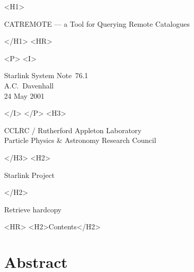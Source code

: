 \documentclass[twoside,11pt]{article}
\newcommand{\stardoccategory}  {Starlink System Note}
\newcommand{\stardocsource}    {ssn\stardocnumber}
\newcommand{\stardocnumber}    {76.1}
\newcommand{\stardocauthors}   {A.C.~Davenhall}
\newcommand{\stardocdate}      {24 May 2001}
\newcommand{\stardoctitle}     {CATREMOTE --- a Tool for Querying Remote
Catalogues}
\newcommand{\htmladdnormallink}[2]{#1}
\newcommand{\htmladdimg}[1]{}
\newcommand{\htmlref}[2]{#1}
\newcommand{\htmladdtonavigation}[1]{}
\newcommand{\xlabel}[1]{}
\renewcommand{\_}{\texttt{\symbol{95}}}
\begin{document}
\begin{htmlonly}
   \xlabel{}
   \begin{rawhtml} <H1> \end{rawhtml}
      \stardoctitle
   \begin{rawhtml} </H1> <HR> \end{rawhtml}

   \begin{rawhtml} <P> <I> \end{rawhtml}
   \stardoccategory\ \stardocnumber \\
   \stardocauthors \\
   \stardocdate
   \begin{rawhtml} </I> </P> <H3> \end{rawhtml}
      \htmladdnormallink{CCLRC / Rutherford Appleton Laboratory}
                        {http://www.cclrc.ac.uk} \\
      \htmladdnormallink{Particle Physics \& Astronomy Research Council}
                        {http://www.pparc.ac.uk} \\
   \begin{rawhtml} </H3> <H2> \end{rawhtml}
      \htmladdnormallink{Starlink Project}{http://www.starlink.rl.ac.uk/}
   \begin{rawhtml} </H2> \end{rawhtml}
   \htmladdnormallink{\htmladdimg{source.gif} Retrieve hardcopy}
      {http://www.starlink.rl.ac.uk/cgi-bin/hcserver?\stardocsource}\\

  \label{stardoccontents}
  \begin{rawhtml} 
    <HR>
    <H2>Contents</H2>
  \end{rawhtml}
  \htmladdtonavigation{\htmlref{\htmladdimg{contents_motif.gif}}
        {stardoccontents}}

  \section{\xlabel{abstract}Abstract}

\end{htmlonly}
\end{document}
